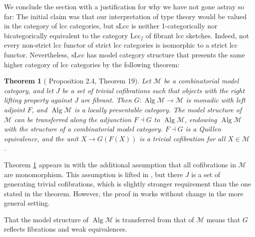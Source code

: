 \documentclass[a4paper]{article}
\newtheorem{theorem}{Theorem}
\theoremstyle{remark}
\theoremstyle{definition}
\begin{document}
We conclude the section with a justification for why we have not gone astray so far:
The initial claim was that our interpretation of type theory would be valued in the category of lcc categories, but $\mathrm{sLcc}$ is neither 1-categorically nor bicategorically equivalent to the category $\mathrm{Lcc}_f$ of fibrant lcc sketches.
Indeed, not every non-strict lcc functor of strict lcc categories is isomorphic to a strict lcc functor.
Nevertheless, $\mathrm{sLcc}$ has model category structure that presents the same higher category of lcc categories by the following theorem:
\begin{theorem}[\cite{algebraic-models} Proposition 2.4, \cite{equipping-weak-equivalences} Theorem 19]
  \label{th:algebraically-fibrant-model-category}
  Let $\mathcal{M}$ be a combinatorial model category, and let $J$ be a set of trivial cofibrations such that objects with the right lifting property against $J$ are fibrant.
  Then $G : \operatorname{Alg} \mathcal{M} \rightarrow \mathcal{M}$ is monadic with left adjoint $F$, and $\operatorname{Alg} \mathcal{M}$ is a locally presentable category.
  The model structure of $\mathcal{M}$ can be transferred along the adjunction $F \dashv G$ to $\operatorname{Alg} \mathcal{M}$, endowing $\operatorname{Alg} \mathcal{M}$ with the structure of a combinatorial model category.
  $F \dashv G$ is a Quillen equivalence, and the unit $X \rightarrow G(F(X))$ is a trivial cofibration for all $X \in \mathcal{M}$.
\end{theorem}
Theorem \ref{th:algebraically-fibrant-model-category} appears in \cite{algebraic-models} with the additional assumption that all cofibrations in $\mathcal{M}$ are monomorphism.
This assumption is lifted in \cite{equipping-weak-equivalences}, but there $J$ is a set of generating trivial cofibrations, which is slightly stronger requirement than the one stated in the theorem.
However, the proof in \cite{equipping-weak-equivalences} works without change in the more general setting.

That the model structure of $\operatorname{Alg} \mathcal{M}$ is transferred from that of $\mathcal{M}$ means that $G$ reflects fibrations and weak equivalences.
\end{document}
